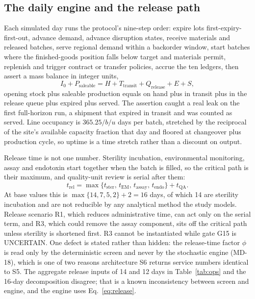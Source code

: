 \subsection{The daily engine and the release path}

Each simulated day runs the protocol's nine-step order: expire lots first-expiry-first-out,
advance demand, advance disruption states, receive materials and released batches, serve
regional demand within a backorder window, start batches where the finished-goods position falls
below target and materials permit, replenish and trigger contract or transfer policies, accrue
the ten ledgers, then assert a mass balance in integer units,
\begin{equation}
I_{0} + P_{\mathrm{saleable}} = H + T_{\mathrm{transit}} + Q_{\mathrm{release}} + E + S ,
\label{eq:massbalance}
\end{equation}
opening stock plus saleable production equals on hand plus in transit plus in the release queue
plus expired plus served. The assertion caught a real leak on the first full-horizon run, a
shipment that expired in transit and was counted as served. Line occupancy is $365.25/b/u$ days
per batch, stretched by the reciprocal of the site's available capacity fraction that day and
floored at changeover plus production cycle, so uptime is a time stretch rather than a discount
on output.

Release time is not one number. Sterility incubation, environmental monitoring, assay and
endotoxin start together when the batch is filled, so the critical path is their maximum, and
quality-unit review is serial after them:
\begin{equation}
t_{\mathrm{rel}} = \max\{t_{\mathrm{ster}},\, t_{\mathrm{EM}},\, t_{\mathrm{assay}},\,
t_{\mathrm{endo}}\} + t_{\mathrm{QA}} .
\label{eq:release}
\end{equation}
At base values this is $\max\{14,7,5,2\}+2 = 16$ days, of which 14 are sterility incubation and
are not reducible by any analytical method the study models. Release scenario R1, which reduces
administrative time, can act only on the serial term, and R3, which could remove the assay
component, sits off the critical path unless sterility is shortened first. R3 cannot be
instantiated while gate G15 is UNCERTAIN. One defect is stated rather than hidden: the
release-time factor $\phi$ is read only by the deterministic screen and never by the stochastic
engine (MD-18), which is one of two reasons architecture S6 returns service numbers identical to
S5. The aggregate release inputs of 14 and 12 days in Table~\ref{tab:ops} and the 16-day
decomposition disagree; that is a known inconsistency between screen and engine, and the engine
uses Eq.~\ref{eq:release}.

